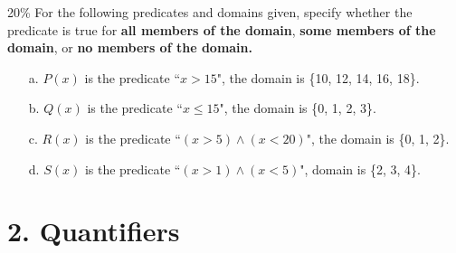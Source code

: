 \documentclass[a4paper,12pt]{book}
\begin{document}
        \begin{question}{2}{20\%}
            For the following predicates and domains given, specify
            whether the predicate is true for \textbf{all members of the domain},
            \textbf{some members of the domain}, or \textbf{no members of the domain.}
        \end{question}

        \begin{enumerate}
            \item[a.] $P(x)$ is the predicate ``$x > 15$", the domain is \{10, 12, 14, 16, 18\}.
            \item[b.] $Q(x)$ is the predicate ``$x \leq 15$", the domain is \{0, 1, 2, 3\}.
            \item[c.] $R(x)$ is the predicate ``$(x > 5) \land (x < 20)$", the domain is \{0, 1, 2\}.
            \item[d.] $S(x)$ is the predicate ``$(x > 1) \land (x < 5)$", domain is \{2, 3, 4\}.
        \end{enumerate}
         

    \newpage
    \section*{2. Quantifiers}
\end{document}
